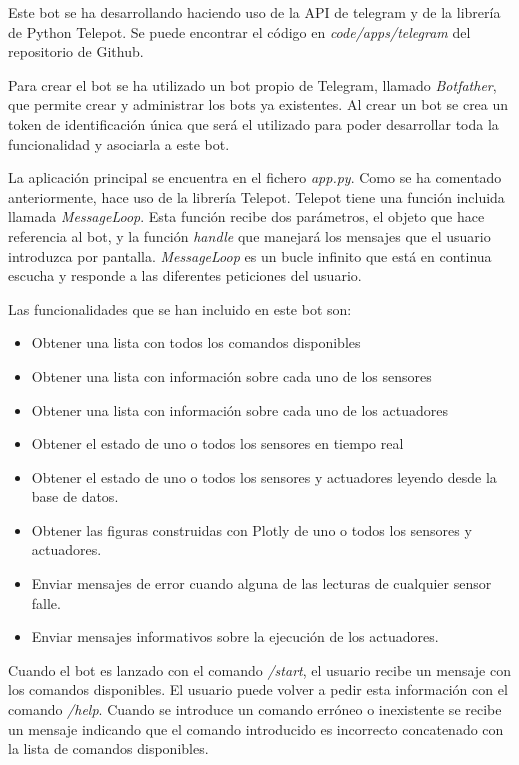\documentclass[a4paper, 12pt, oneside]{book}
\begin{document}
Este bot se ha desarrollando haciendo uso de la API de telegram y de la librería de Python Telepot. Se puede encontrar el código en \textit{code/apps/telegram} del repositorio de Github.

Para crear el bot se ha utilizado un bot propio de Telegram, llamado \textit{Botfather}, que permite crear y administrar los bots ya existentes. Al crear un bot se crea un token de identificación única que será el utilizado para poder desarrollar toda la funcionalidad y asociarla a este bot.
 
La aplicación principal se encuentra en el fichero \textit{app.py}. Como se ha comentado anteriormente, hace uso de la librería Telepot. Telepot tiene una función incluida llamada \textit{MessageLoop}. Esta función recibe dos parámetros, el objeto que hace referencia al bot, y la función \textit{handle} que manejará los mensajes que el usuario introduzca por pantalla. \textit{MessageLoop} es un bucle infinito que está en continua escucha y responde a las diferentes peticiones del usuario.

Las funcionalidades que se han incluido en este bot son:
\begin{itemize}
\item Obtener una lista con todos los comandos disponibles
\item Obtener una lista con información sobre cada uno de los sensores
\item Obtener una lista con información sobre cada uno de los actuadores
\item Obtener el estado de uno o todos los sensores en tiempo real
\item Obtener el estado de uno o todos los sensores y actuadores leyendo desde la base de datos.
\item Obtener las figuras construidas con Plotly de uno o todos los sensores y actuadores.
\item Enviar mensajes de error cuando alguna de las lecturas de cualquier sensor falle.
\item Enviar mensajes informativos sobre la ejecución de los actuadores.
\end{itemize}


Cuando el bot es lanzado con el comando \textit{/start}, el usuario recibe un mensaje con los comandos disponibles. El usuario puede volver a pedir esta información con el comando \textit{/help}.
Cuando se introduce un comando erróneo o inexistente se recibe un mensaje indicando que el comando introducido es incorrecto concatenado con la lista de comandos disponibles.
\end{document}
